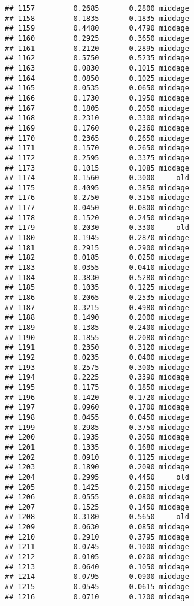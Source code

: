 \documentclass[
]{article}
\begin{document}
\begin{verbatim}
## 1157         0.2685       0.2800 middage
## 1158         0.1835       0.1835 middage
## 1159         0.4480       0.4790 middage
## 1160         0.2925       0.3650 middage
## 1161         0.2120       0.2895 middage
## 1162         0.5750       0.5235 middage
## 1163         0.0830       0.1015 middage
## 1164         0.0850       0.1025 middage
## 1165         0.0535       0.0650 middage
## 1166         0.1730       0.1950 middage
## 1167         0.1805       0.2050 middage
## 1168         0.2310       0.3300 middage
## 1169         0.1760       0.2360 middage
## 1170         0.2365       0.2650 middage
## 1171         0.1570       0.2650 middage
## 1172         0.2595       0.3375 middage
## 1173         0.1015       0.1085 middage
## 1174         0.1560       0.3000     old
## 1175         0.4095       0.3850 middage
## 1176         0.2750       0.3150 middage
## 1177         0.0450       0.0800 middage
## 1178         0.1520       0.2450 middage
## 1179         0.2030       0.3300     old
## 1180         0.1945       0.2870 middage
## 1181         0.2915       0.2900 middage
## 1182         0.0185       0.0250 middage
## 1183         0.0355       0.0410 middage
## 1184         0.3830       0.5280 middage
## 1185         0.1035       0.1225 middage
## 1186         0.2065       0.2535 middage
## 1187         0.3215       0.4980 middage
## 1188         0.1490       0.2000 middage
## 1189         0.1385       0.2400 middage
## 1190         0.1855       0.2080 middage
## 1191         0.2350       0.3120 middage
## 1192         0.0235       0.0400 middage
## 1193         0.2575       0.3005 middage
## 1194         0.2225       0.3390 middage
## 1195         0.1175       0.1850 middage
## 1196         0.1420       0.1720 middage
## 1197         0.0960       0.1700 middage
## 1198         0.0455       0.0450 middage
## 1199         0.2985       0.3750 middage
## 1200         0.1935       0.3050 middage
## 1201         0.1335       0.1680 middage
## 1202         0.0910       0.1125 middage
## 1203         0.1890       0.2090 middage
## 1204         0.2995       0.4450     old
## 1205         0.1425       0.2150 middage
## 1206         0.0555       0.0800 middage
## 1207         0.1525       0.1450 middage
## 1208         0.3180       0.5650     old
## 1209         0.0630       0.0850 middage
## 1210         0.2910       0.3795 middage
## 1211         0.0745       0.1000 middage
## 1212         0.0105       0.0200 middage
## 1213         0.0640       0.1050 middage
## 1214         0.0795       0.0900 middage
## 1215         0.0545       0.0615 middage
## 1216         0.0710       0.1200 middage

\end{verbatim}
\end{document}
